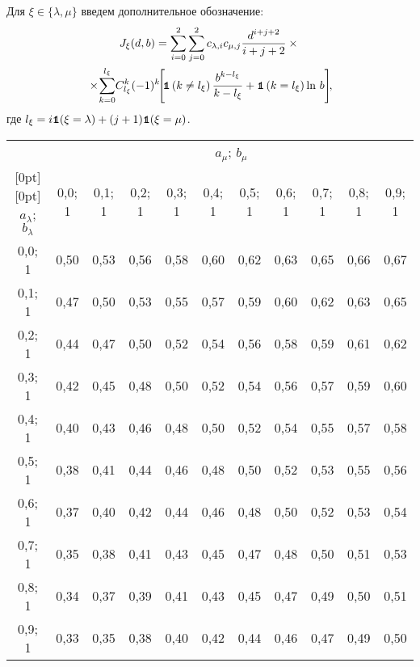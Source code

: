 \begin{multicols}{2}
\smallskip

Для $\xi\in\{\lambda,\mu\}$ введем дополнительное обозначение:
\begin{multline}
\label{Integral_J}
J_\xi(d,b)=\sum\limits_{i=0}^{2}\sum\limits_{j=0}^{2}c_{\lambda,i}
c_{\mu,j}\fr{d^{i+j+2}}{i+j+2}\times{}\\
\hspace*{-1.8mm}{}\times\!\sum\limits_{k=0}^{l_\xi}\!C_{l_\xi}^k(-1)^k \!
\Bigg[\!
\Ik\left(k\neq l_\xi\right)\fr{b^{k-l_\xi}}{k-l_\xi}+\Ik\left(
k=l_\xi\right)\ln \,b\Bigg]\!,\!\!\!
\end{multline}
где $l_\xi\hm=i \Ik(\xi=\lambda)+(j+1)\Ik(\xi=\mu)$.

\end{multicols}

\begin{table}\small
\begin{center}
\vspace*{2ex}

\begin{tabular}{|c|c|c|c|c|c|c|c|c|c|c|}
\hline
&\multicolumn{10}{c|}{$a_{\mu}$; $b_{\mu}$}\\
\cline{2-11}
\multicolumn{1}{|c|}{\raisebox{6pt}[0pt][0pt]{$a_{\lambda}$; $b_{\lambda}$}}
& 0,0;  1& 0,1;  1& 0,2;  1& 0,3;  1& 0,4;  1& 0,5;  1& 0,6;  1& 0,7;  1& 0,8;  1& 0,9;  1\\
\hline
 0,0;  1& 0,50& 0,53& 0,56& 0,58& 0,60& 0,62& 0,63& 0,65& 0,66& 0,67\\
 0,1;  1& 0,47& 0,50& 0,53& 0,55& 0,57& 0,59& 0,60& 0,62& 0,63& 0,65\\
 0,2;  1& 0,44& 0,47& 0,50& 0,52& 0,54& 0,56& 0,58& 0,59& 0,61& 0,62\\
 0,3;  1& 0,42& 0,45& 0,48& 0,50& 0,52& 0,54& 0,56& 0,57& 0,59& 0,60\\
 0,4;  1& 0,40& 0,43& 0,46& 0,48& 0,50& 0,52& 0,54& 0,55& 0,57& 0,58\\
 0,5;  1& 0,38& 0,41& 0,44& 0,46& 0,48& 0,50& 0,52& 0,53& 0,55& 0,56\\
 0,6;  1& 0,37& 0,40& 0,42& 0,44& 0,46& 0,48& 0,50& 0,52& 0,53& 0,54\\
 0,7;  1& 0,35& 0,38& 0,41& 0,43& 0,45& 0,47& 0,48& 0,50& 0,51& 0,53\\
 0,8;  1& 0,34& 0,37& 0,39& 0,41& 0,43& 0,45& 0,47& 0,49& 0,50& 0,51\\
 0,9;  1& 0,33& 0,35& 0,38& 0,40& 0,42& 0,44& 0,46& 0,47& 0,49& 0,50\\
\hline
\end{tabular}
\end{center}
\end{table}

